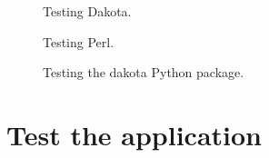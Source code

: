\begin{figure}[!htbp]
  \caption{Testing Dakota.}
  \label{fig:dakota_test}
\end{figure}

\begin{figure}[!htbp]
  \caption{Testing Perl.}
  \label{fig:perl_test}
\end{figure}

\begin{figure}[!htbp]
  \caption{Testing the dakota Python package.}
  \label{fig:dakota_py_test}
\end{figure}

\clearpage
\section{Test the \texttt{\getsoftwarename{}} application}
\label{sec:test_local}


